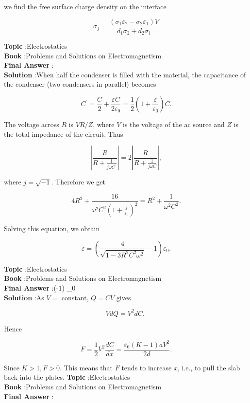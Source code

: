 \documentclass[10pt]{article}
\begin{document}
we find the free surface charge density on the interface

$$
\sigma_{f}=\frac{\left(\sigma_{1} \varepsilon_{2}-\sigma_{2} \varepsilon_{1}\right) V}{d_{1} \sigma_{2}+d_{2} \sigma_{1}}
$$

\textbf{Topic} :Electrostatics\\
\textbf{Book} :Problems and Solutions on Electromagnetism\\
\textbf{Final Answer} :\\


\textbf{Solution} :When half the condenser is filled with the material, the capacitance of the condenser (two condensers in parallel) becomes

$$
C^{\prime}=\frac{C}{2}+\frac{\varepsilon C}{2 \varepsilon_{0}}=\frac{1}{2}\left(1+\frac{\varepsilon}{\varepsilon_{0}}\right) C .
$$

The voltage across $R$ is $V R / Z$, where $V$ is the voltage of the ac source and $Z$ is the total impedance of the circuit. Thus

$$
\left|\frac{R}{R+\frac{1}{j \omega C^{\prime}}}\right|=2\left|\frac{R}{R+\frac{1}{j \omega C}}\right|,
$$

where $j=\sqrt{-1}$. Therefore we get

$$
4 R^{2}+\frac{16}{\omega^{2} C^{2}\left(1+\frac{\varepsilon}{\varepsilon_{0}}\right)^{2}}=R^{2}+\frac{1}{\omega^{2} C^{2}} .
$$

Solving this equation, we obtain

$$
\varepsilon=\left(\frac{4}{\sqrt{1-3 R^{2} C^{2} \omega^{2}}}-1\right) \varepsilon_{0} .
$$

\textbf{Topic} :Electrostatics\\
\textbf{Book} :Problems and Solutions on Electromagnetism\\
\textbf{Final Answer} :\left(-1\right) \varepsilon_{0}\\


\textbf{Solution} :As $V=$ constant, $Q=C V$ gives

$$
V d Q=V^{2} d C \text {. }
$$

Hence

$$
F=\frac{1}{2} V^{2} \frac{d C}{d x}=\frac{\varepsilon_{0}(K-1) a V^{2}}{2 d} .
$$

Since $K>1, F>0$. This means that $F$ tends to increase $x$, i.e., to pull the slab back into the plates.
\textbf{Topic} :Electrostatics\\
\textbf{Book} :Problems and Solutions on Electromagnetism\\
\textbf{Final Answer} :\\
\end{document}

